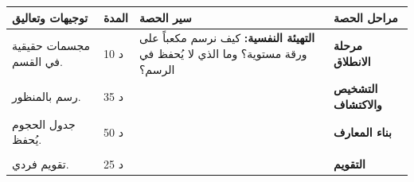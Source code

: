 \documentclass[12pt,a4paper]{article}
\newenvironment{LTR}{\begin{otherlanguage}{english}}{\end{otherlanguage}}
\newcommand{\ar}[1]{\foreignlanguage{arabic}{#1}}
\newcommand{\Phase}[1]{\textbf{#1}}
\newenvironment{Sayr}{%
\begin{LTR}\renewcommand{\arraystretch}{1.25}
\begin{longtable}{|p{0.17\textwidth}|>{\centering\arraybackslash}p{0.06\textwidth}|p{0.53\textwidth}|>{\centering\arraybackslash}p{0.12\textwidth}|}
\hline\rowcolor{cThm!12}\ar{\textbf{توجيهات وتعاليق}} & \ar{\textbf{المدة}} & \ar{\textbf{سير الحصة}} & \ar{\textbf{مراحل الحصة}}\\\hline\endhead
\hline\endfoot}{\end{longtable}\end{LTR}}
\newcommand{\Row}[4]{\ar{\small #4} & \ar{#3} & \ar{#2} & \cellcolor{cThm!8}\ar{\Phase{#1}}\\\hline}
\newcommand{\Lab}[2]{\foreignlanguage{english}{\tcbox[on line,colback=#1,colframe=#1,boxrule=0pt,arc=2pt,boxsep=1pt,left=5pt,right=5pt,top=1pt,bottom=1pt]{\ar{\textcolor{white}{\textbf{#2}}}}}}
\newcommand{\ck}{\ensuremath{{\color{cRem}\checkmark}}}
\begin{document}
\begin{Sayr}
\Row{مرحلة الانطلاق}{%
\textbf{التهيئة النفسية:} كيف نرسم مكعباً على ورقة مستوية؟ وما الذي لا يُحفظ في الرسم؟}{10 د}{مجسمات حقيقية في القسم.}
\Row{التشخيص والاكتشاف}{%
\Lab{cEx}{وضعية مقترحة}\ مكعب $ABCDEFGH$ حرفه $3$ cm.\par\ck\ نرسمه بالمنظور متساوي القياس: الأحرف المخفية بالمتقطع ، والمتوازية تبقى متوازية.\par
\ck\ نحسب طول القطر $[AG]$ بتطبيق فيثاغورس مرتين: $AC=3\sqrt2$ ، $AG=3\sqrt3$.\par
}{35 د}{رسم بالمنظور.}
\Row{بناء المعارف}{%
\Lab{cThm}{المنظور متساوي القياس}\ يحافظ على التوازي ومنتصفات القطع ونسب الأطوال على مستقيم واحد ، ولا يحافظ على الزوايا ولا على كل الأطوال.\par\smallskip\begin{LTR}\centering \begin{tikzpicture}[scale=1.1,font=\scriptsize]
\coordinate (A) at (0,0); \coordinate (B) at (2,0); \coordinate (C) at (2.8,0.7); \coordinate (D) at (0.8,0.7);
\coordinate (E) at (0,2); \coordinate (F) at (2,2); \coordinate (G) at (2.8,2.7); \coordinate (H) at (0.8,2.7);
\draw[thick] (A)--(B)--(C)--(G)--(H)--(E)--cycle (B)--(F)--(E) (F)--(G);
\draw[dashed] (A)--(D)--(C) (D)--(H);
\foreach \p/\q in {A/below left,B/below right,C/right,D/above left,E/left,F/below right,G/above right,H/above left} \node[\q] at (\p){$\p$};
\end{tikzpicture}\end{LTR}\par \Lab{cThm}{الحجوم}\par\ck\ متوازي مستطيلات: $V=abc$ ؛ موشور وأسطوانة: $V=B\times h$.\par
\ck\ هرم: $V=\frac13B\times h$ ؛ كرة: $V=\frac43\pi r^3$ ومساحتها $4\pi r^2$.\par
}{50 د}{جدول الحجوم يُحفظ.}
\Row{}{%
\Lab{cEx}{مثال}\ هرم قاعدته مربع ضلعه $4$ وارتفاعه $6$: $V=\frac13\times16\times6=32$ ؛ أسطوانة $r=2$ ، $h=5$: $V=20\pi$.\par\Lab{cThm!80!black}{حذار}\ في الرسم بالمنظور لا نقيس الأطوال مباشرة.}{}{}
\Row{التقويم}{%
\Lab{cEx}{تطبيق}\par متوازي مستطيلات أبعاده $2$ ، $3$ ، $6$. احسب حجمه وطول قطره ، ثم حجم كرة نصف قطرها $3$.\par\textbf{الحل:} $V=36$ ؛ القطر $\sqrt{4+9+36}=7$ ؛ $V=\frac43\pi\times27=36\pi$.\par\textbf{واجب منزلي:} تمارين من الكتاب المدرسي.\par\smallskip\textbf{ملاحظات حول سير الحصة:} \dotfill}{25 د}{تقويم فردي.}
\end{Sayr}
\end{document}
